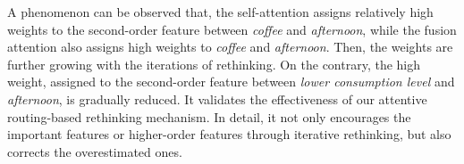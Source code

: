 \documentclass[11pt]{article}
\def\modelname{HyCLID}
\begin{document}
A phenomenon can be observed that, the self-attention assigns relatively high weights to the second-order feature between \textit{coffee} and \textit{afternoon}, while the fusion attention also assigns high weights to \textit{coffee} and \textit{afternoon}. Then, the weights are further growing with the iterations of rethinking. On the contrary, the high weight, assigned to the second-order feature between \textit{lower consumption level} and \textit{afternoon}, is gradually reduced. It validates the effectiveness of our attentive routing-based rethinking mechanism. In detail, it not only encourages the important features or higher-order features through iterative rethinking, but also corrects the overestimated ones.


% 



% 
\end{document}
